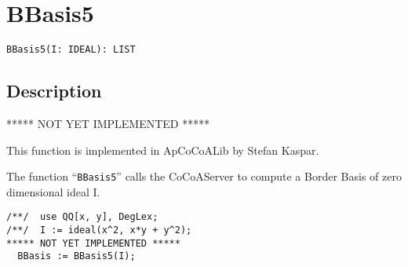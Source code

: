 \documentclass[a4paper]{mybook}
\newenvironment{command}{}{} %
\begin{document}
\section{BBasis5}
\label{BBasis5}
\begin{command} %


\begin{Verbatim}[label=syntax, rulecolor=\color{MidnightBlue},
frame=single]
BBasis5(I: IDEAL): LIST
\end{Verbatim}


\subsection*{Description}

***** NOT YET IMPLEMENTED *****
\par 
This function is implemented in ApCoCoALib by Stefan Kaspar.
\par 
The function ``\verb&BBasis5&'' calls the CoCoAServer to compute
a Border Basis of zero dimensional ideal I.
\begin{Verbatim}[label=example, rulecolor=\color{PineGreen}, frame=single]
/**/  use QQ[x, y], DegLex;
/**/  I := ideal(x^2, x*y + y^2);
***** NOT YET IMPLEMENTED *****
  BBasis := BBasis5(I);
\end{Verbatim}


\end{command} %
\end{document}
